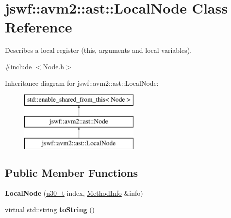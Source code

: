 \hypertarget{classjswf_1_1avm2_1_1ast_1_1_local_node}{\section{jswf\+:\+:avm2\+:\+:ast\+:\+:Local\+Node Class Reference}
\label{classjswf_1_1avm2_1_1ast_1_1_local_node}
}


Describes a local register ({\ttfamily this}, arguments and local variables).  




{\ttfamily \#include $<$Node.\+h$>$}

Inheritance diagram for jswf\+:\+:avm2\+:\+:ast\+:\+:Local\+Node\+:\begin{figure}[H]
\begin{center}
\leavevmode
\includegraphics[height=3.000000cm]{classjswf_1_1avm2_1_1ast_1_1_local_node}
\end{center}
\end{figure}
\subsection*{Public Member Functions}
\begin{DoxyCompactItemize}
\item 
\hypertarget{classjswf_1_1avm2_1_1ast_1_1_local_node_ab99bfb86b8bf0ac14ea885643c2374c6}{{\bfseries Local\+Node} (\hyperlink{namespacejswf_aa10d9ddca2a6a5debdc261dfae3d1117}{u30\+\_\+t} index, \hyperlink{structjswf_1_1avm2_1_1_method_info}{Method\+Info} \&info)}\label{classjswf_1_1avm2_1_1ast_1_1_local_node_ab99bfb86b8bf0ac14ea885643c2374c6}

\item 
\hypertarget{classjswf_1_1avm2_1_1ast_1_1_local_node_a623638809696bad0f4a5142a85064b96}{virtual std\+::string {\bfseries to\+String} ()}\label{classjswf_1_1avm2_1_1ast_1_1_local_node_a623638809696bad0f4a5142a85064b96}

\end{DoxyCompactItemize}
